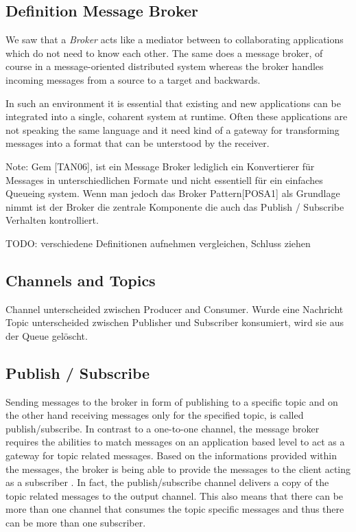 \subsection{Definition Message Broker}
We saw that a \textit{Broker} acts like a mediator between to collaborating
applications which do not need to know each other. The same does a message
broker, of course in a message-oriented distributed system whereas the broker
handles incoming messages from a source to a target and backwards.

In such an environment it is essential that existing and new applications can be
integrated into a single, coharent system at runtime. Often these applications
are not speaking the same language and it need kind of a gateway for
transforming messages into a format that can be unterstood by the receiver.
\cite{TAN06}

Note: Gem [TAN06], ist ein Message Broker lediglich ein Konvertierer für
Messages in unterschiedlichen Formate und nicht essentiell für ein einfaches
Queueing system. Wenn man jedoch das Broker Pattern[POSA1] als Grundlage nimmt
ist der Broker die zentrale Komponente die auch das Publish / Subscribe
Verhalten kontrolliert.

TODO: verschiedene Definitionen aufnehmen vergleichen, Schluss ziehen \\

\subsection{Channels and Topics} %
Channel unterscheided zwischen Producer and Consumer. Wurde eine Nachricht
Topic unterscheided zwischen Publisher und Subscriber
konsumiert, wird sie aus der Queue gelöscht.

\subsection{Publish / Subscribe}
Sending messages to the broker in form of publishing to a specific topic and
on the other hand receiving messages only for the specified topic, is called
publish/subscribe.
In contrast to a one-to-one channel, the message broker requires the abilities 
to match messages on an application based level to act as a gateway for topic
related messages. Based on the informations provided within the messages, 
the broker is being able to provide the messages to the client acting as a 
subscriber \cite{TAN06}. In fact, the publish/subscribe channel delivers a copy of the 
topic related messages to the output channel. This also means that there can 
be more than one channel that consumes the topic specific messages and thus there
can be more than one subscriber. \cite{EIP03}


